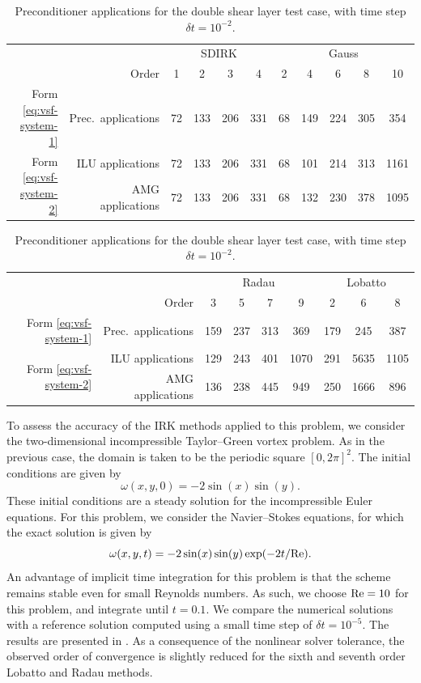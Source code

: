 \documentclass[review]{siamart}
\begin{document}
\begin{table}
	\centering
	\caption{Preconditioner applications for the double shear layer test case, with time step $\delta t = 10^{-2}.$}
	\label{tab:dsl-iters}
	\begin{tabular}{rr|cccc|ccccc}
		\toprule
		&& \multicolumn{4}{c}{SDIRK} & \multicolumn{5}{c}{Gauss} \\
		& Order  & 1 & 2 & 3 & 4 & 2 & 4 & 6 & 8 & 10\\
		\midrule
		Form \eqref{eq:vsf-system-1} & Prec.\ applications & 72 & 133 & 206 & 331 & 68 & 149 & 224 & 305 & 354\\
		\midrule
		\multirow{2}{*}{Form \eqref{eq:vsf-system-2}} & ILU applications & 72 & 133 & 206 & 331 & 68 & 101 & 214 & 313 & 1161\\
		& AMG applications & 72 & 133 & 206 & 331 & 68 & 132 & 230 & 378 & 1095\\
		\bottomrule
	\end{tabular}

	\vspace{\floatsep}

	\begin{tabular}{rr|cccc|ccc}
		\toprule
		&& \multicolumn{4}{c}{Radau} & \multicolumn{3}{c}{Lobatto} \\
		& Order  & 3 & 5 & 7 & 9 & 2 & 6 & 8\\
		\midrule
		Form \eqref{eq:vsf-system-1} & Prec.\ applications & 159 & 237 & 313 & 369 & 179 & 245 & 387\\
		\midrule
		\multirow{2}{*}{Form \eqref{eq:vsf-system-2}} & ILU applications & 129 & 243 & 401 & 1070 & 291 & 5635 & 1105\\
		& AMG applications & 136 & 238 & 445 & 949 & 250 & 1666 & 896\\
		\bottomrule
	\end{tabular}
\end{table}

To assess the accuracy of the IRK methods applied to this problem, we consider the two-dimensional incompressible Taylor--Green vortex problem.
As in the previous case, the domain is taken to be the periodic square $[0,2\pi]^2$.
The initial conditions are given by
\[
	\omega(x,y,0) = -2\sin(x)\sin(y).
\]
These initial conditions are a steady solution for the incompressible Euler equations.
For this problem, we consider the Navier--Stokes equations, for which the exact solution is given by
\[
	\omega(x,y,t) = -2\sin(x)\sin(y) \exp(-2t/\rm Re).
\]
An advantage of implicit time integration for this problem is that the scheme remains stable even for small Reynolds numbers.
As such, we choose $\rm Re = 10$ for this problem, and integrate until $t = 0.1$.
We compare the numerical solutions with a reference solution computed using a small time step of $\delta t = 10^{-5}$.
The results are presented in .
As a consequence of the nonlinear solver tolerance, the observed order of convergence is slightly reduced for the sixth and seventh order Lobatto and Radau methods.
\end{document}
